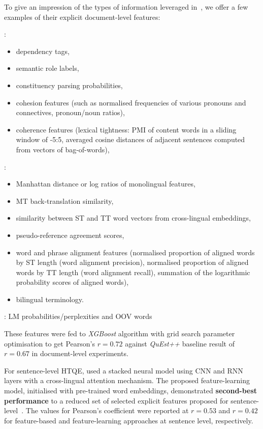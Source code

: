 To give an impression of the types of information leveraged in~\citet{Yuan2018}, we offer a few examples of their explicit document-level features:
\begin{description}\compresslist{}
	\item[monolingual]: 
	\begin{itemize}\compresslist{}
		\item dependency tags, 
		\item semantic role labels, 
		\item constituency parsing probabilities, 
		\item cohesion features (such as normalised frequencies of various pronouns and connectives, pronoun/noun ratios), 
		\item coherence features (lexical tightness: \gls{PMI} of content words in a sliding window of -5:5, averaged cosine distances of adjacent sentences computed from vectors of bag-of-words),
	\end{itemize}
	
	\item[bilingual]:
	\begin{itemize}\compresslist{}
		\item Manhattan distance or log ratios of monolingual features, 
		\item MT back-translation similarity,
		\item similarity between ST and TT word vectors from cross-lingual embeddings, 
		\item pseudo-reference agreement scores,
		\item word and phrase alignment features (normalised proportion of aligned words by ST length (word alignment precision), normalised proportion of aligned words by TT length (word alignment recall), summation of the logarithmic probability scores of aligned words),
		\item bilingual terminology.
	\end{itemize}
	\item[language modelling features]: LM probabilities/perplexities and \gls{OOV} words
\end{description} 

These features were fed to \textit{XGBoost} algorithm with grid search parameter optimisation to get Pearson's $r=0.72$ against \textit{QuEst++} baseline result of $r=0.67$ in document-level experiments.

For sentence-level \gls*{HTQE}, \citet{Yuan2018} used a stacked neural model using \gls{CNN} and \gls{RNN} layers with a cross-lingual attention mechanism.
The proposed feature-learning model, initialised with pre-trained word embeddings, demonstrated \textbf{second-best performance} to a reduced set of selected explicit features proposed for sentence-level~\cite[see Table 7.3 Sentence-level \gls*{HTQE} results in][p.160]{Yuan2018}. The values for Pearson's coefficient were reported at $r=0.53$ and $r=0.42$ for feature-based and feature-learning approaches at sentence level, respectively. 

